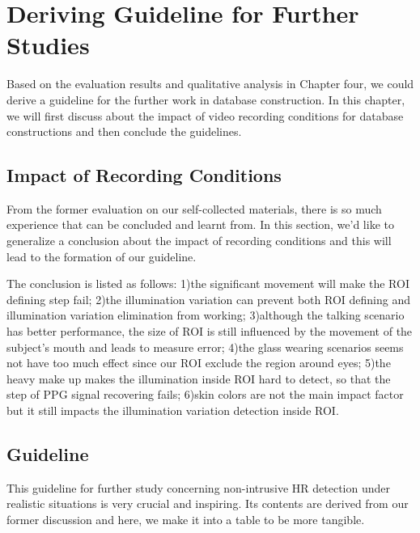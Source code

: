 \chapter{Deriving Guideline for Further Studies}
Based on the evaluation results and qualitative analysis in Chapter four, we could derive a guideline for the further work in database construction. In this chapter, we will first discuss about the impact of video recording conditions for database constructions and then conclude the guidelines.

\section{Impact of Recording Conditions} 
From the former evaluation on our self-collected materials, there is so much experience that can be concluded and learnt from. In this section, we'd like to generalize a conclusion about the impact of recording conditions and this will lead to the formation of our guideline. 

The conclusion is listed as follows: 1)the significant movement will make the ROI defining step fail; 2)the illumination variation can prevent both ROI defining and illumination variation elimination from working; 3)although the talking scenario has better performance, the size of ROI is still influenced by the movement of the subject's mouth and leads to measure error; 4)the glass wearing scenarios seems not have too much effect since our ROI exclude the region around eyes; 5)the heavy make up makes the illumination inside ROI hard to detect, so that the step of PPG signal recovering fails; 6)skin colors are not the main impact factor but it still impacts the illumination variation detection inside ROI. 

\section{Guideline}
This guideline for further study concerning non-intrusive HR detection under realistic situations is very crucial and inspiring. Its contents are derived from our former discussion and here, we make it into a table to be more tangible. 

